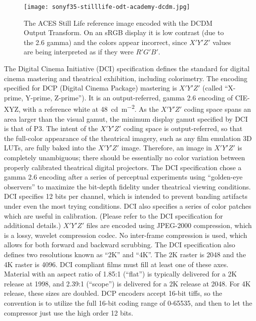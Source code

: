 \begin{figure}[H]
    \texttt{[image: sonyf35-stilllife-odt-academy-dcdm.jpg]}
    \caption{
        The ACES Still Life reference image encoded with the DCDM Output Transform.\newline
        On an sRGB display it is low contrast (due to the 2.6 gamma) and the colors appear incorrect, since $X'Y'Z'$ values are being interpreted as if they were $R'G'B'$.\newline
        \ccCopyrightAmpas
    }%
    \label{fig:odt-academy-dcdm}
\end{figure}

The Digital Cinema Initiative (DCI) specification \parencite{DigitalCinemaInitiatives2018} defines the standard for digital cinema mastering and theatrical exhibition, including colorimetry.
The encoding specified for DCP (Digital Cinema Package) mastering is  \(X'Y'Z'\) (called ``X-prime, Y-prime, Z-prime'').
It is an output-referred, gamma 2.6 encoding of CIE-XYZ, with a reference white at \SI{48}{\candela\per\metre\squared}.
As the \(X'Y'Z'\) coding space spans an area larger than the visual gamut, the minimum display gamut specified by DCI is that of P3.
\ccPar{}
The intent of the \(X'Y'Z'\) coding space is output-referred, so that the full-color appearance of the theatrical imagery, such as any film emulation 3D LUTs, are fully baked into the \(X'Y'Z'\) image.
Therefore, an image in \(X'Y'Z'\) is completely unambiguous; there should be essentially no color variation between properly calibrated theatrical digital projectors.
\ccPar{}
The DCI specification chose a gamma 2.6 encoding after a series of perceptual experiments using ``golden-eye observers'' to maximize the bit-depth fidelity under theatrical viewing conditions.
DCI specifies 12 bits per channel, which is intended to prevent banding artifacts under even the most trying conditions.
DCI also specifies a series of color patches which are useful in calibration.
(Please refer to the DCI specification for additional details.) \(X'Y'Z'\) files are encoded using JPEG-2000 compression, which is a lossy, wavelet compression codec.
No inter-frame compression is used, which allows for both forward and backward scrubbing.
The DCI specification also defines two resolutions known as ``2K'' and ``4K''.
The 2K raster is 2048 and the 4K raster is 4096.
DCI compliant films must fill at least one of these axes.
Material with an aspect ratio of 1.85:1 (``flat'') is typically delivered for a 2K release at 1998, and 2.39:1 (``scope'') is delivered for a 2K release at 2048.
For 4K release, these sizes are doubled.
DCP encoders accept 16-bit tiffs, so the convention is to utilize the full 16-bit coding range of 0-65535, and then to let the compressor just use the high order 12 bits.

